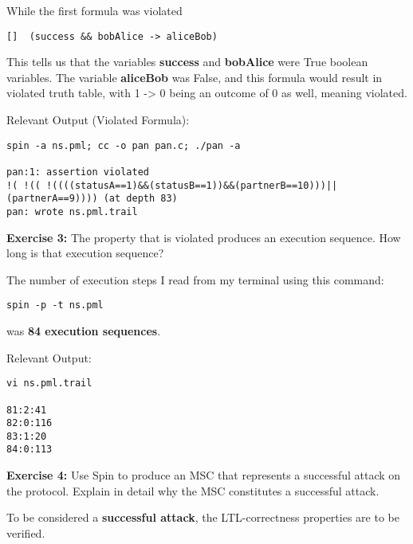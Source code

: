 \documentclass{article}
\theoremstyle{theorem}
\theoremstyle{definition}
\theoremstyle{remark}
\begin{document}
\noindent\newline While the first formula was violated
\begin{verbatim}
[]  (success && bobAlice -> aliceBob)
\end{verbatim}


\noindent\newline\newline This tells us that the variables \textbf{success} and \textbf{bobAlice} were True boolean variables. The variable \textbf{aliceBob} was False, and this formula would result in violated truth table, with 1 -> 0 being an outcome of 0 as well, meaning violated.

\noindent\newline Relevant Output (Violated Formula):
\begin{verbatim}
spin -a ns.pml; cc -o pan pan.c; ./pan -a

pan:1: assertion violated  
!( !(( !((((statusA==1)&&(statusB==1))&&(partnerB==10)))||(partnerA==9)))) (at depth 83)
pan: wrote ns.pml.trail

\end{verbatim}


\noindent\newline\textbf{Exercise 3:}
The property that is violated produces an execution sequence. How long is that execution sequence?

\noindent\newline The number of execution steps I read from my terminal using this command:
\begin{verbatim}
spin -p -t ns.pml
\end{verbatim}

\noindent was \textbf{84 execution sequences}. 

\noindent\newline Relevant Output:
\begin{verbatim}
vi ns.pml.trail

81:2:41
82:0:116
83:1:20
84:0:113
\end{verbatim}



\noindent\newline\textbf{Exercise 4:}
Use Spin to produce an MSC that represents a successful attack on the protocol. Explain in detail why the MSC constitutes a successful attack.

\noindent\newline To be considered a \textbf{successful attack}, the LTL-correctness properties are to be verified.
\end{document}
